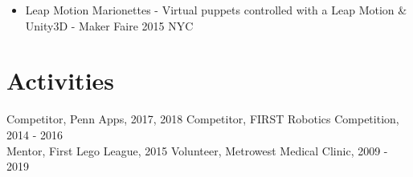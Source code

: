 \documentclass[10pt]{article}
\begin{document}
\begin{flushleft}
\begin{itemize}
		\item Leap Motion Marionettes - Virtual puppets controlled with a Leap Motion \& Unity3D - Maker Faire 2015 NYC
	\end{itemize}

\section{Activities}
	Competitor, Penn Apps, 2017, 2018 \hfill Competitor, FIRST Robotics Competition, 2014 - 2016 \\
	Mentor, First Lego League, 2015 \hfill Volunteer, Metrowest Medical Clinic, 2009 - 2019


\end{flushleft}
\end{document}
